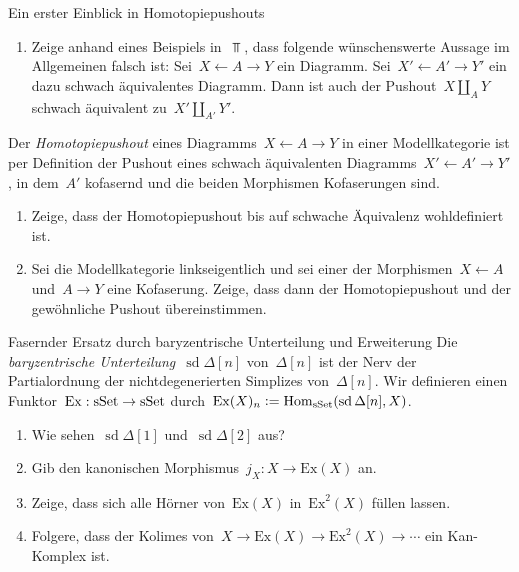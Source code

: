 \documentclass{uebblatt}
\DeclareMathOperator{\sd}{sd}
\begin{document}

\begin{aufgabe}{Ein erster Einblick in Homotopiepushouts}
\begin{enumerate}
\item Zeige anhand eines Beispiels in~$\Top$, dass folgende wünschenswerte
Aussage im Allgemeinen falsch ist: Sei~$X \leftarrow A \rightarrow Y$ ein
Diagramm. Sei~$X' \leftarrow A' \rightarrow Y'$ ein dazu schwach äquivalentes
Diagramm. Dann ist auch der Pushout~$X \amalg_A Y$ schwach äquivalent zu~$X'
\amalg_{A'} Y'$.
\end{enumerate}
Der \emph{Homotopiepushout} eines Diagramms~$X \leftarrow A \rightarrow
Y$ in einer Modellkategorie ist per Definition der Pushout eines schwach
äquivalenten Diagramms~$X' \leftarrow A' \rightarrow Y'$, in dem~$A'$ kofasernd
und die beiden Morphismen Kofaserungen sind.
\begin{enumerate}
\addtocounter{enumi}{1}
\item Zeige, dass der Homotopiepushout bis auf schwache Äquivalenz
wohldefiniert ist.
\item Sei die Modellkategorie linkseigentlich und sei einer der Morphismen~$X
\leftarrow A$ und~$A \rightarrow Y$ eine Kofaserung. Zeige, dass dann der
Homotopiepushout und der gewöhnliche Pushout übereinstimmen.
\end{enumerate}
\end{aufgabe}

\begin{aufgabe}{Fasernder Ersatz durch baryzentrische Unterteilung und Erweiterung}
Die \emph{baryzentrische Unterteilung}~$\sd \Delta[n]$ von~$\Delta[n]$ ist der
Nerv der Partialordnung der nichtdegenerierten Simplizes von~$\Delta[n]$. Wir
definieren einen Funktor~$\mathrm{Ex} : \mathrm{sSet} \to \mathrm{sSet}$
durch~$\mathrm{Ex}(X)_n \defeq \Hom_\sSet(\sd \Delta[n], X)$.
\begin{enumerate}
\item Wie sehen~$\sd \Delta[1]$ und~$\sd \Delta[2]$ aus?
\item Gib den kanonischen Morphismus~$j_X : X \to \mathrm{Ex}(X)$ an.
\item Zeige, dass sich alle Hörner von~$\mathrm{Ex}(X)$ in~$\mathrm{Ex}^2(X)$
füllen lassen.
\item Folgere, dass der Kolimes von~$X \to \mathrm{Ex}(X) \to
\mathrm{Ex}^2(X) \to \cdots$ ein Kan-Komplex ist.
\end{enumerate}
\end{aufgabe}
\end{document}
